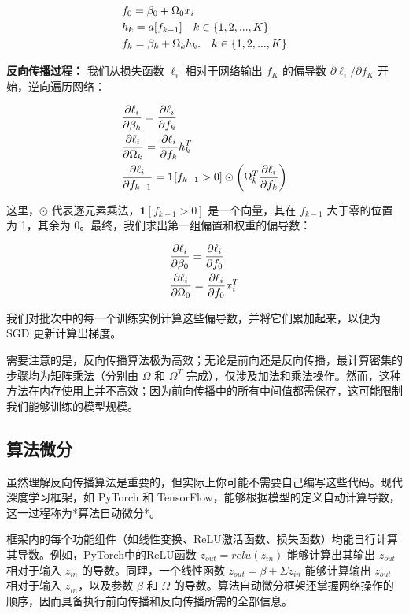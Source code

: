 \begin{align}
&f_0 = \beta_0 + \Omega_0 x_i \notag \\
&h_k = a[f_{k-1}] \quad k \in \{1,2,...,K\} \notag \\
&f_k = \beta_k + \Omega_k h_k. \quad k \in \{1,2,...,K\} 
\end{align} 

\textbf{反向传播过程：} 我们从损失函数 \(\ell_i\) 相对于网络输出 \(f_K\) 的偏导数 \(\partial \ell_i/\partial f_K\) 开始，逆向遍历网络：


\begin{align}
&\frac{\partial \ell_i}{\partial \beta_k} = \frac{\partial \ell_i}{\partial f_k} \notag \\
&\frac{\partial \ell_i}{\partial \Omega_k} = \frac{\partial \ell_i}{\partial f_k} h_k^T \notag \\
&\frac{\partial \ell_i}{\partial f_{k-1}} = \mathbf{1}[f_{k-1} > 0] \odot \left( \Omega_k^T \frac{\partial \ell_i}{\partial f_k} \right)  
\end{align} 

这里，\(\odot\) 代表逐元素乘法，\(\mathbf{1}[f_{k-1} > 0]\) 是一个向量，其在 \(f_{k-1}\) 大于零的位置为 1，其余为 0。最终，我们求出第一组偏置和权重的偏导数：


\begin{align}
&\frac{\partial \ell_i}{\partial \beta_0} = \frac{\partial \ell_i}{\partial f_0} \notag \\
&\frac{\partial \ell_i}{\partial \Omega_0} = \frac{\partial \ell_i}{\partial f_0} x_i^T 
\end{align} 


我们对批次中的每一个训练实例计算这些偏导数，并将它们累加起来，以便为 SGD 更新计算出梯度。

需要注意的是，反向传播算法极为高效；无论是前向还是反向传播，最计算密集的步骤均为矩阵乘法（分别由 \(\Omega\) 和 \(\Omega^T\) 完成），仅涉及加法和乘法操作。然而，这种方法在内存使用上并不高效；因为前向传播中的所有中间值都需保存，这可能限制我们能够训练的模型规模。
\subsection{算法微分}
虽然理解反向传播算法是重要的，但实际上你可能不需要自己编写这些代码。现代深度学习框架，如 PyTorch 和 TensorFlow，能够根据模型的定义自动计算导数，这一过程称为*算法自动微分*。

框架内的每个功能组件（如线性变换、ReLU激活函数、损失函数）均能自行计算其导数。例如，PyTorch中的ReLU函数 \(z_{out} = relu(z_{in})\) 能够计算出其输出 \(z_{out}\) 相对于输入 \(z_{in}\) 的导数。同理，一个线性函数 \(z_{out} = \beta + \Sigma z_{in}\) 能够计算输出 \(z_{out}\) 相对于输入 \(z_{in}\)，以及参数 \(\beta\) 和 \(\Omega\) 的导数。算法自动微分框架还掌握网络操作的顺序，因而具备执行前向传播和反向传播所需的全部信息。

